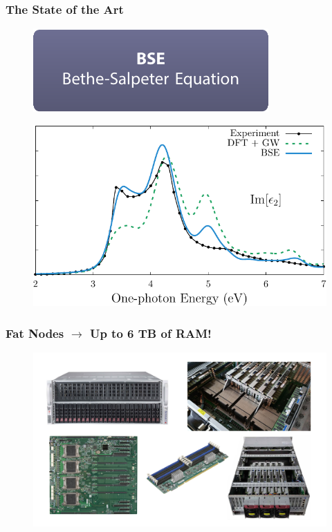 \documentclass{beamer}
\begin{document}
\begin{frame}
\frametitle{The State of the Art}
\begin{figure}
\centering
\includegraphics[height=0.2\textheight]{diag-methods_future}
\end{figure}
\begin{figure}
\centering
\includegraphics[height=0.55\textheight]{fig-mbpt03}
\end{figure}
\end{frame}

\begin{frame}
\frametitle{Fat Nodes $\rightarrow$ Up to 6 TB of RAM!}
\begin{figure}
\centering
\includegraphics[width=\textwidth]{image-fats}
\end{figure}
\end{frame}
\end{document}

